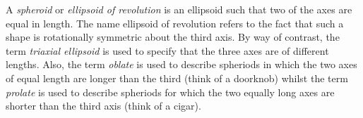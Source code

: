 \documentclass[12pt]{article}
\begin{document}
A \emph{spheroid} or \emph{ellipsoid of revolution} is an ellipsoid such that two of the axes are equal in length.  The name ellipsoid of revolution refers to the fact that such a shape is rotationally symmetric about the third axis.  By way of contrast, the term \emph{triaxial ellipsoid} is used to specify that the three axes are of different lengths.  Also, the term \emph{oblate} is used to describe spheriods in which the two axes of equal length are longer than the third (think of a doorknob) whilst the term \emph{prolate} is used to describe spheriods for which the two equally long axes are shorter than the third axis (think of a cigar).
\end{document}
